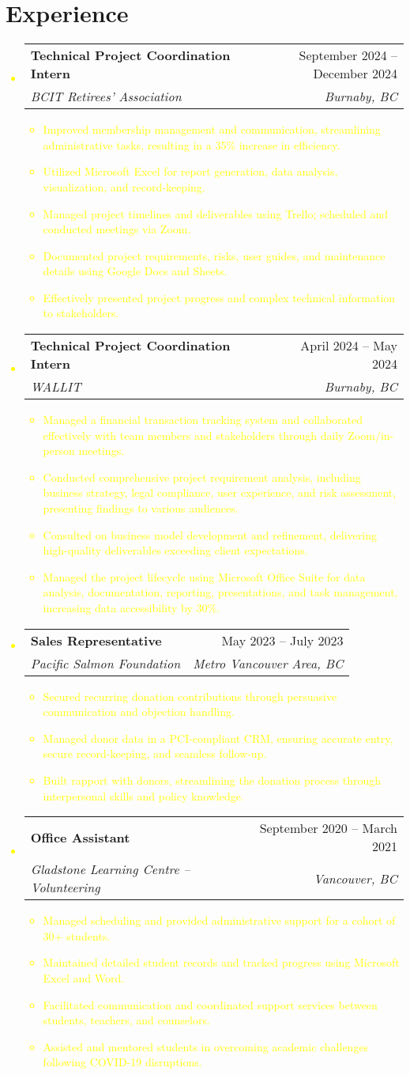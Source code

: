 \documentclass[letterpaper,11pt]{article}
\makeatletter
\newcommand{\resumeItem}[1]{
\item\small{
{#1 \vspace{-2pt}}
}
}
\newcommand{\resumeSubheading}[4]{
\vspace{-2pt}\item
\begin{tabular*}{0.97\textwidth}[t]{l@{\extracolsep{\fill}}r}
\textbf{#1} & #2 \\
\textit{\small#3} & \textit{\small #4} \\
\end{tabular*}\vspace{-7pt}
}
\newcommand{\resumeSubHeadingListStart}{\begin{itemize}[leftmargin=0.15in, label={}]}
\newcommand{\resumeSubHeadingListEnd}{\end{itemize}}
\newcommand{\resumeItemListStart}{\begin{itemize}}
\newcommand{\resumeItemListEnd}{\end{itemize}\vspace{-5pt}}
\makeatother
\begin{document}
\section{Experience}
\textcolor{yellow}{\resumeSubHeadingListStart
\resumeSubheading{Technical Project Coordination Intern}{September 2024 – December 2024}{BCIT Retirees’ Association}{Burnaby, BC}
\resumeItemListStart
\resumeItem{Improved membership management and communication, streamlining administrative tasks, resulting in a 35\% increase in efficiency.}
\resumeItem{Utilized Microsoft Excel for report generation, data analysis, visualization, and record-keeping.}
\resumeItem{Managed project timelines and deliverables using Trello; scheduled and conducted meetings via Zoom.}
\resumeItem{Documented project requirements, risks, user guides, and maintenance details using Google Docs and Sheets.}
\resumeItem{Effectively presented project progress and complex technical information to stakeholders.}
\resumeItemListEnd

\resumeSubheading{Technical Project Coordination Intern}{April 2024 – May 2024}{WALLIT}{Burnaby, BC}
\resumeItemListStart
\resumeItem{Managed a financial transaction tracking system and collaborated effectively with team members and stakeholders through daily Zoom/in-person meetings.}
\resumeItem{Conducted comprehensive project requirement analysis, including business strategy, legal compliance, user experience, and risk assessment, presenting findings to various audiences.}
\resumeItem{Consulted on business model development and refinement, delivering high-quality deliverables exceeding client expectations.}
\resumeItem{Managed the project lifecycle using Microsoft Office Suite for data analysis, documentation, reporting, presentations, and task management, increasing data accessibility by 30\%.}
\resumeItemListEnd

\resumeSubheading{Sales Representative}{May 2023 – July 2023}{Pacific Salmon Foundation}{Metro Vancouver Area, BC}
\resumeItemListStart
\resumeItem{Secured recurring donation contributions through persuasive communication and objection handling.}
\resumeItem{Managed donor data in a PCI-compliant CRM, ensuring accurate entry, secure record-keeping, and seamless follow-up.}
\resumeItem{Built rapport with donors, streamlining the donation process through interpersonal skills and policy knowledge.}
\resumeItemListEnd

\resumeSubheading{Office Assistant}{September 2020 – March 2021}{Gladstone Learning Centre – Volunteering}{Vancouver, BC}
\resumeItemListStart
\resumeItem{Managed scheduling and provided administrative support for a cohort of 30+ students.}
\resumeItem{Maintained detailed student records and tracked progress using Microsoft Excel and Word.}
\resumeItem{Facilitated communication and coordinated support services between students, teachers, and counselors.}
\resumeItem{Assisted and mentored students in overcoming academic challenges following COVID-19 disruptions.}
\resumeItemListEnd
\resumeSubHeadingListEnd}
\end{document}
